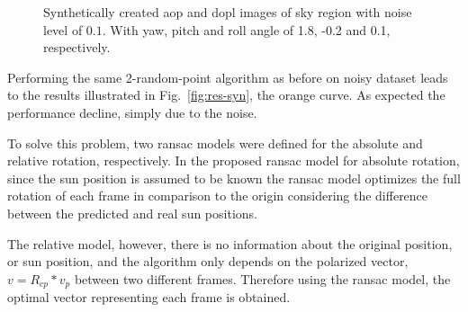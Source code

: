\begin{figure}
  \centering
  \hfill
  \hspace*{\fill}
  \caption{Synthetically created \gls{aop} and \gls{dopl} images of sky
      region with noise level of $0.1$. With yaw, pitch and roll angle of 1.8, -0.2 and 0.1, respectively.}
  \label{fig:aop-dop-syn-noisy}
\end{figure}

Performing the same 2-random-point algorithm as before on noisy dataset leads
to the results illustrated in Fig.~\ref{fig:res-syn}, the orange curve. As expected the
performance decline, simply due to the noise.

To solve this problem, two ransac models were defined for the absolute and
relative rotation, respectively.  In the proposed ransac model for absolute
rotation, since the sun position is assumed to be known the ransac model
optimizes the full rotation of each frame in comparison to the origin
considering the difference between the predicted and real sun positions.

The relative model, however, there is no information about the original
position, or sun position, and the algorithm only depends on the polarized
vector, $v = R_{cp}*v_p$ between two different frames. Therefore using the ransac
model, the optimal vector representing each frame is obtained.

